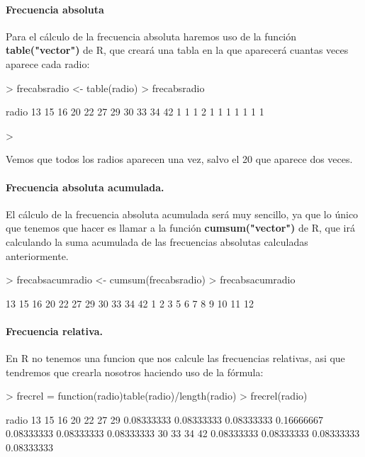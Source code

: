 \documentclass [a4paper] {article}
\begin{document}
\paragraph{Frecuencia absoluta}
Para el cálculo de la frecuencia absoluta haremos uso de la función \textbf{table("vector")} de R, que
creará una tabla en la que aparecerá cuantas veces aparece cada radio:
\begin{Schunk}
\begin{Sinput}
> frecabsradio <- table(radio)
> frecabsradio
\end{Sinput}
\begin{Soutput}
radio
13 15 16 20 22 27 29 30 33 34 42 
 1  1  1  2  1  1  1  1  1  1  1 
\end{Soutput}
\begin{Sinput}
> 
\end{Sinput}
\end{Schunk}
Vemos que todos los radios aparecen una vez, salvo el 20 que aparece dos veces.

\paragraph{Frecuencia absoluta acumulada.}
El cálculo de la frecuencia absoluta acumulada será muy sencillo, ya que lo único que tenemos que
hacer es llamar a la función \textbf{cumsum("vector")} de R, que irá calculando la suma acumulada
de las frecuencias absolutas calculadas anteriormente.
\begin{Schunk}
\begin{Sinput}
> frecabsacumradio <- cumsum(frecabsradio)
> frecabsacumradio
\end{Sinput}
\begin{Soutput}
13 15 16 20 22 27 29 30 33 34 42 
 1  2  3  5  6  7  8  9 10 11 12 
\end{Soutput}
\end{Schunk}

\paragraph{Frecuencia relativa.}
En R no tenemos una funcion que nos calcule las frecuencias relativas, asi que tendremos que crearla
nosotros haciendo uso de la fórmula:
\begin{Schunk}
\begin{Sinput}
> frecrel = function(radio){table(radio)/length(radio)}
> frecrel(radio)
\end{Sinput}
\begin{Soutput}
radio
        13         15         16         20         22         27         29 
0.08333333 0.08333333 0.08333333 0.16666667 0.08333333 0.08333333 0.08333333 
        30         33         34         42 
0.08333333 0.08333333 0.08333333 0.08333333 
\end{Soutput}
\end{Schunk}
\end{document}
